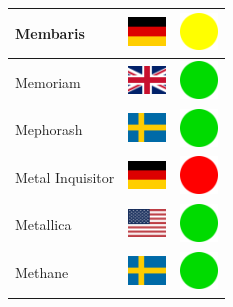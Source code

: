 \documentclass[12pt, a4paper, twoside]{report}
\begin{document}
\begin{center}
\begin{longtable}{|p{5cm}|p{2cm}|p{2cm}|}
 Membaris                                                   & \includegraphics[width=1cm]{../4x3/de} &   \includegraphics[width=1cm]{../likes/m} \\ \hline
 Memoriam                                                   & \includegraphics[width=1cm]{../4x3/gb} &   \includegraphics[width=1cm]{../likes/y} \\ \hline
 Mephorash                                                  & \includegraphics[width=1cm]{../4x3/se} &   \includegraphics[width=1cm]{../likes/y} \\ \hline
 Metal Inquisitor                                           & \includegraphics[width=1cm]{../4x3/de} &   \includegraphics[width=1cm]{../likes/n} \\ \hline
 Metallica                                                  & \includegraphics[width=1cm]{../4x3/us} &   \includegraphics[width=1cm]{../likes/y} \\ \hline
 Methane                                                    & \includegraphics[width=1cm]{../4x3/se} &   \includegraphics[width=1cm]{../likes/y} \\ \hline

\end{longtable}
\end{center}
\end{document}
